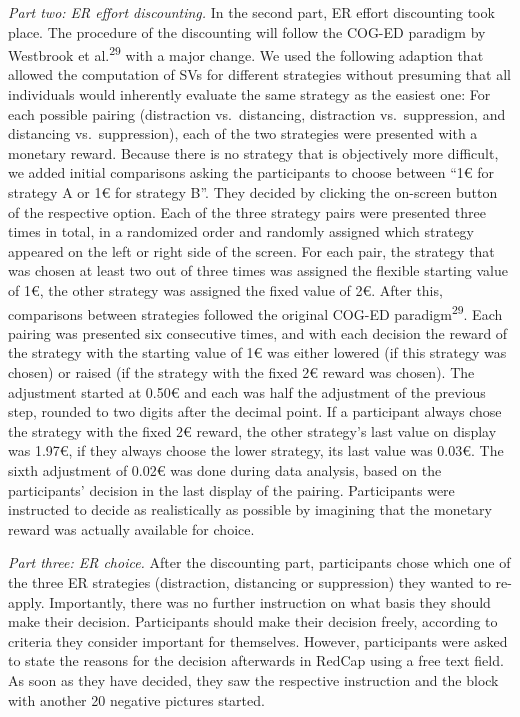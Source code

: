 \documentclass[
  man,floatsintext]{apa6}
\begin{document}
\emph{Part two: ER effort discounting.} In the second part, ER effort discounting took place.
The procedure of the discounting will follow the COG-ED paradigm by Westbrook et al.\textsuperscript{29} with a major change.
We used the following adaption that allowed the computation of SVs for different strategies without presuming that all individuals would inherently evaluate the same strategy as the easiest one: For each possible pairing (distraction vs.~distancing, distraction vs.~suppression, and distancing vs.~suppression), each of the two strategies were presented with a monetary reward.
Because there is no strategy that is objectively more difficult, we added initial comparisons asking the participants to choose between ``1€ for strategy A or 1€ for strategy B''.
They decided by clicking the on-screen button of the respective option.
Each of the three strategy pairs were presented three times in total, in a randomized order and randomly assigned which strategy appeared on the left or right side of the screen.
For each pair, the strategy that was chosen at least two out of three times was assigned the flexible starting value of 1€, the other strategy was assigned the fixed value of 2€.
After this, comparisons between strategies followed the original COG-ED paradigm\textsuperscript{29}.
Each pairing was presented six consecutive times, and with each decision the reward of the strategy with the starting value of 1€ was either lowered (if this strategy was chosen) or raised (if the strategy with the fixed 2€ reward was chosen).
The adjustment started at 0.50€ and each was half the adjustment of the previous step, rounded to two digits after the decimal point.
If a participant always chose the strategy with the fixed 2€ reward, the other strategy's last value on display was 1.97€, if they always choose the lower strategy, its last value was 0.03€.
The sixth adjustment of 0.02€ was done during data analysis, based on the participants' decision in the last display of the pairing.
Participants were instructed to decide as realistically as possible by imagining that the monetary reward was actually available for choice.

\emph{Part three: ER choice.} After the discounting part, participants chose which one of the three ER strategies (distraction, distancing or suppression) they wanted to re-apply.
Importantly, there was no further instruction on what basis they should make their decision.
Participants should make their decision freely, according to criteria they consider important for themselves.
However, participants were asked to state the reasons for the decision afterwards in RedCap using a free text field.
As soon as they have decided, they saw the respective instruction and the block with another 20 negative pictures started.
\end{document}
